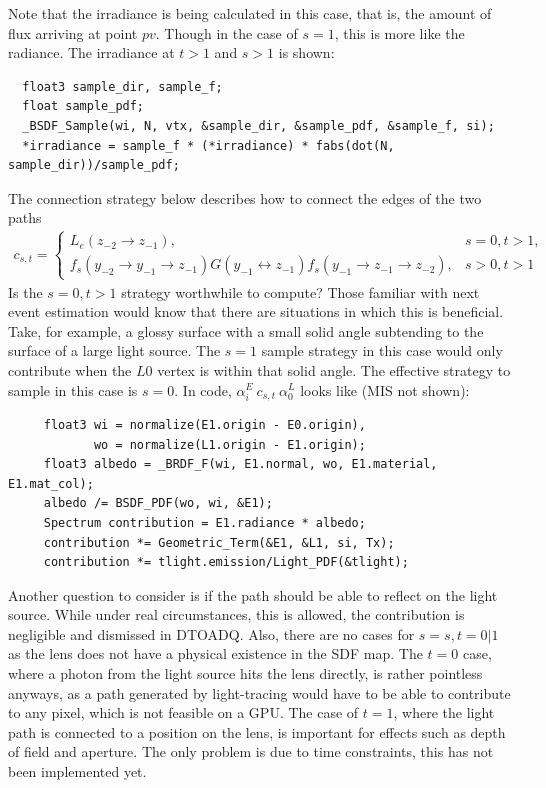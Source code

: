 \documentclass{article}
\begin{document}
  Note that the irradiance is being calculated in this case, that is, the amount
  of flux arriving at point $pv$. Though in the case of $s=1$, this is more like
  the radiance. The irradiance at $t > 1$ and $s > 1$ is shown:

\begin{lstlisting}
  float3 sample_dir, sample_f;
  float sample_pdf;
  _BSDF_Sample(wi, N, vtx, &sample_dir, &sample_pdf, &sample_f, si);
  *irradiance = sample_f * (*irradiance) * fabs(dot(N, sample_dir))/sample_pdf;
\end{lstlisting}
  



  The connection strategy below describes how to connect the edges of the two
paths
  \begin{align}
    c_{s, t} =
    \begin{cases}
      L_e(z_{-2} \rightarrow z_{-1}), &s = 0, t > 1,\\
      f_s(y_{-2} \rightarrow y_{-1} \rightarrow z_{-1}) G(y_{-1} \leftrightarrow
      z_{-1}) f_s(y_{-1} \rightarrow z_{-1} \rightarrow z_{-2}), &s > 0, t > 1
    \end{cases}
  \end{align}
    Is the $s = 0, t > 1$ strategy worthwhile to compute? Those familiar with
next event estimation would know that there are situations in which this is
beneficial. Take, for example, a glossy surface with a small solid angle
subtending to the surface of a large light source. The $s=1$ sample strategy in
this case would only contribute when the $L0$ vertex is within that solid angle.
The effective strategy to sample in this case is $s = 0$. In code,
$\alpha_i^E\:c_{s,t}\:\alpha_0^L$ looks like (MIS not shown):
    \begin{lstlisting}
     float3 wi = normalize(E1.origin - E0.origin),
            wo = normalize(L1.origin - E1.origin);
     float3 albedo = _BRDF_F(wi, E1.normal, wo, E1.material, E1.mat_col);
     albedo /= BSDF_PDF(wo, wi, &E1);
     Spectrum contribution = E1.radiance * albedo;
     contribution *= Geometric_Term(&E1, &L1, si, Tx);
     contribution *= tlight.emission/Light_PDF(&tlight);
    \end{lstlisting}
    
    Another question to consider is if the path should be able to reflect on the
light source. While under real circumstances, this is allowed, the contribution
is negligible and dismissed in DTOADQ. Also, there are no cases for $s = s, t =
0|1$ as the lens does not have a physical existence in the SDF map. The $t = 0$
case, where a photon from the light source hits the lens directly, is rather
pointless anyways, as a path generated by light-tracing would have to be able to
contribute to any pixel, which is not feasible on a GPU. The case of $t = 1$,
where the light path is connected to a position on the lens, is important for
effects such as depth of field and aperture. The only problem is due to time
constraints, this has not been implemented yet.
\end{document}
